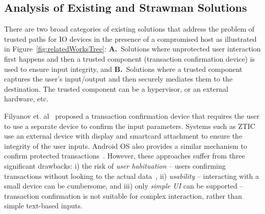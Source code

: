 \subsection{Analysis of Existing and Strawman Solutions}
\label{sec:problemStatement:existingSolution}

There are two broad categories of existing solutions that address the problem of trusted paths for IO devices in the presence of a compromised host as illustrated in Figure~\ref{fig:relatedWorksTree}: \textbf{A.}~Solutions where unprotected user interaction first happens and then a trusted component (transaction confirmation device) is used to ensure input integrity,
and \textbf{B.}~Solutions where a trusted component captures the user's input/output and then securely mediates them to the destination. The trusted component can be a hypervisor, or an external hardware, etc. %

 Filyanov et. al~\cite{filyanov2011uni} proposed a transaction confirmation device that requires the user to use a separate device to confirm the input parameters. Systems such as ZTIC~\cite{weigold2011secure} use an external device with display and smartcard attachment to ensure the integrity of the user inputs. Android OS also provides a similar mechanism to confirm protected transactions~\cite{android_confirm}. 
However, these approaches suffer from three significant drawbacks: i) the risk of \emph{user habituation} -- users confirming transactions without looking to the actual data~\cite{anderson2016warning},
ii) \emph{usability} -- interacting with a small device can be cumbersome, and iii) only \emph{simple UI} can be supported -- transaction confirmation is not suitable for complex interaction, rather than simple text-based inputs.


